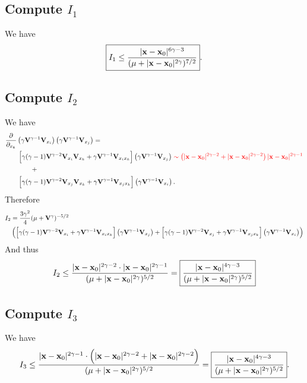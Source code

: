 \subsection{Compute $I_1$} We have
\begin{align*}
\fbox{$\displaystyle
    I_1 \leq \frac
    {
        |\mathbf{x}-\mathbf{x}_0|^{6\gamma-3}
    }
    {
        (\mu+|\mathbf{x}-\mathbf{x}_0|^{2\gamma})^{7/2}
    }
$}.
\end{align*}

\subsection{Compute $I_2$}
We have
\begin{align*}
    &\frac{\partial}{\partial_{x_k}} 
    \left(\gamma\mathbf{V}^{\gamma-1}\mathbf{V}_{x_i}\right)
    \left(\gamma\mathbf{V}^{\gamma-1}\mathbf{V}_{x_j}\right) = \\
    & \qquad 
        \Big[ 
        \gamma(\gamma-1)\mathbf{V}^{\gamma-2} \mathbf{V} _{x_i}\mathbf{V}_{x_k}
        + 
        \gamma  \mathbf{V}^{\gamma-1} \mathbf{V}_{x_ix_k}
        \Big] \left(\gamma\mathbf{V}^{\gamma-1}\mathbf{V}_{x_j}\right)  
        \color{red} 
            \sim \left(|\mathbf{x}-\mathbf{x}_0|^{2\gamma-2} + |\mathbf{x}-\mathbf{x}_0|^{2\gamma-2}\right)|\mathbf{x}-\mathbf{x}_0|^{2\gamma-1}
        \color{black} \\
    & \qquad \qquad + \\    
    & \qquad  
        \Big[ 
        \gamma(\gamma-1)\mathbf{V}^{\gamma-2} \mathbf{V}_{x_j}\mathbf{V}_{x_k}
        + 
        \gamma  \mathbf{V}^{\gamma-1}\mathbf{V}_{x_jx_k}
        \Big] \left(\gamma\mathbf{V}^{\gamma-1}\mathbf{V}_{x_i}\right). 
\end{align*}
Therefore
\begin{align*}
    I_2 &= \frac{3\gamma^2}{4}(\mu+\mathbf{V}^\gamma)^{-5/2} \\
    & 
    \left(
        \Big[ 
        \gamma(\gamma-1)\mathbf{V}^{\gamma-2}\mathbf{V}_{x_i}
        + 
        \gamma  \mathbf{V}^{\gamma-1} \mathbf{V}_{x_ix_k}
        \Big] 
        \left(\gamma\mathbf{V}^{\gamma-1}\mathbf{V}_{x_j}\right)
        + 
        \Big[ 
        \gamma(\gamma-1)\mathbf{V}^{\gamma-2} \mathbf{V} _{x_j}
        + 
        \gamma  \mathbf{V}^{\gamma-1} \mathbf{V}_{x_jx_k}
        \Big] \left(\gamma\mathbf{V}^{\gamma-1}\mathbf{V}_{x_i}\right) 
    \right)
\end{align*}
And thus
\begin{align*}
    I_2 \leq 
    \frac{
        |\mathbf{x}-\mathbf{x}_0|^{2\gamma-2} \cdot |\mathbf{x}-\mathbf{x}_0|^{2\gamma-1} 
    }{(\mu+|\mathbf{x}-\mathbf{x}_0|^{2\gamma})^{5/2}} 
    = 
\fbox{$ \displaystyle 
    \frac{
        |\mathbf{x}-\mathbf{x}_0|^{4\gamma-3}
    }
    {
        (\mu+|\mathbf{x}-\mathbf{x}_0|^{2\gamma})^{5/2}
    }
$}
\end{align*}
\subsection{Compute $I_3$}
We have
\begin{align*}
    I_3 \leq 
    \frac
    {
        |\mathbf{x}-\mathbf{x}_0|^{2\gamma-1} \cdot 
        \Big(
            |\mathbf{x}-\mathbf{x}_0|^{2\gamma-2} + |\mathbf{x}-\mathbf{x}_0|^{2\gamma-2}
        \Big)
    }
    {   
        (\mu+|\mathbf{x}-\mathbf{x}_0|^{2\gamma})^{5/2}
    } 
    = 
    \fbox{$ \displaystyle
    \frac
    {
        |\mathbf{x}-\mathbf{x}_0|^{4\gamma-3}
    }
    {
        (\mu+|\mathbf{x}-\mathbf{x}_0|^{2\gamma})^{5/2}
    }
    $}. 
\end{align*}
